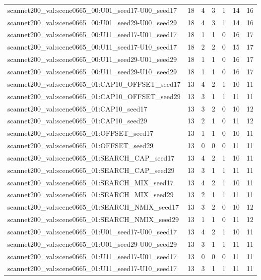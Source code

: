 \begin{table}[t]
\begin{tabular}{lrrrrrr}
scannet200\_val:scene0665\_00:U01\_seed17-U00\_seed17 & 18 & 4 & 3 & 1 & 14 & 16 \\
scannet200\_val:scene0665\_00:U01\_seed29-U00\_seed29 & 18 & 4 & 3 & 1 & 14 & 16 \\
scannet200\_val:scene0665\_00:U11\_seed17-U01\_seed17 & 18 & 1 & 1 & 0 & 16 & 17 \\
scannet200\_val:scene0665\_00:U11\_seed17-U10\_seed17 & 18 & 2 & 2 & 0 & 15 & 17 \\
scannet200\_val:scene0665\_00:U11\_seed29-U01\_seed29 & 18 & 1 & 1 & 0 & 16 & 17 \\
scannet200\_val:scene0665\_00:U11\_seed29-U10\_seed29 & 18 & 1 & 1 & 0 & 16 & 17 \\
scannet200\_val:scene0665\_01:CAP10\_OFFSET\_seed17 & 13 & 4 & 2 & 1 & 10 & 11 \\
scannet200\_val:scene0665\_01:CAP10\_OFFSET\_seed29 & 13 & 3 & 1 & 1 & 11 & 11 \\
scannet200\_val:scene0665\_01:CAP10\_seed17 & 13 & 3 & 2 & 0 & 10 & 12 \\
scannet200\_val:scene0665\_01:CAP10\_seed29 & 13 & 2 & 1 & 0 & 11 & 12 \\
scannet200\_val:scene0665\_01:OFFSET\_seed17 & 13 & 1 & 1 & 0 & 10 & 11 \\
scannet200\_val:scene0665\_01:OFFSET\_seed29 & 13 & 0 & 0 & 0 & 11 & 11 \\
scannet200\_val:scene0665\_01:SEARCH\_CAP\_seed17 & 13 & 4 & 2 & 1 & 10 & 11 \\
scannet200\_val:scene0665\_01:SEARCH\_CAP\_seed29 & 13 & 3 & 1 & 1 & 11 & 11 \\
scannet200\_val:scene0665\_01:SEARCH\_MIX\_seed17 & 13 & 4 & 2 & 1 & 10 & 11 \\
scannet200\_val:scene0665\_01:SEARCH\_MIX\_seed29 & 13 & 2 & 1 & 1 & 11 & 11 \\
scannet200\_val:scene0665\_01:SEARCH\_NMIX\_seed17 & 13 & 3 & 2 & 0 & 10 & 12 \\
scannet200\_val:scene0665\_01:SEARCH\_NMIX\_seed29 & 13 & 1 & 1 & 0 & 11 & 12 \\
scannet200\_val:scene0665\_01:U01\_seed17-U00\_seed17 & 13 & 4 & 2 & 1 & 10 & 11 \\
scannet200\_val:scene0665\_01:U01\_seed29-U00\_seed29 & 13 & 3 & 1 & 1 & 11 & 11 \\
scannet200\_val:scene0665\_01:U11\_seed17-U01\_seed17 & 13 & 0 & 0 & 0 & 11 & 11 \\
scannet200\_val:scene0665\_01:U11\_seed17-U10\_seed17 & 13 & 3 & 1 & 1 & 11 & 11 \\

\end{tabular}
\end{table}
